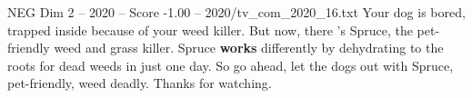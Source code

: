 \begin{textsample}{NEG Dim 2 – 2020 – Score -1.00 – 2020/tv\_com\_2020\_16.txt}  \label{ex:f2_neg_038}
Your dog is bored, trapped inside because of your weed killer.
But now, there 's Spruce, the pet-friendly weed and grass killer.
Spruce \textbf{works} differently by dehydrating to the roots for dead weeds in just one day.
So go ahead, let the dogs out with Spruce, pet-friendly, weed deadly.
Thanks for watching.

\end{textsample}
